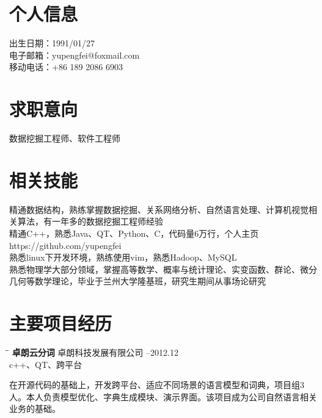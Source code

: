 \documentclass{res}
\begin{document}
 
\begin{CJK}{UTF8}{gbsn}


                                  
\begin{resume}

\section{个人信息} 
出生日期：1991/01/27\\
电子邮箱：yupengfei@foxmail.com\\
移动电话：+86 189 2086 6903
\section{求职意向}          
    数据挖掘工程师、软件工程师        
 
\section{相关技能}        
	精通数据结构，熟练掌握数据挖掘、关系网络分析、自然语言处理、计算机视觉相关算法，有一年多的数据挖掘工程师经验\\
    精通C++，熟悉Java、QT、Python、C，代码量6万行，个人主页https://github.com/yupengfei\\
    熟悉linux下开发环境，熟练使用vim，熟悉Hadoop、MySQL\\    
    熟悉物理学大部分领域，掌握高等数学、概率与统计理论、实变函数、群论、微分几何等数学理论，毕业于兰州大学隆基班，研究生期间从事场论研究
             

\section{主要项目经历}
 \vspace{-0.1in}	
   \begin{tabbing}
   \hspace{2.3in}\= \hspace{2.6in}\= \kill %
    {\bf 卓朗云分词} \>卓朗科技发展有限公司     --2012.12\\
                             \>c++、QT、跨平台
   \end{tabbing}\vspace{-20pt}      %
   在开源代码的基础上，开发跨平台、适应不同场景的语言模型和词典，项目组3人。本人负责模型优化、字典生成模块、演示界面。该项目成为公司自然语言相关业务的基础。
   

\end{resume}
\end{CJK}
\end{document}
